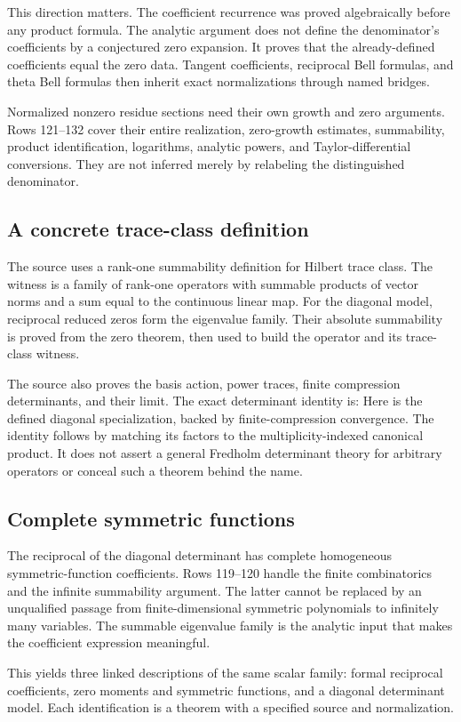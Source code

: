 This direction matters. The coefficient recurrence was proved algebraically before any product formula. The analytic argument does not define the denominator's coefficients by a conjectured zero expansion. It proves that the already-defined coefficients equal the zero data. Tangent coefficients, reciprocal Bell formulas, and theta Bell formulas then inherit exact normalizations through named bridges.

Normalized nonzero residue sections need their own growth and zero arguments. Rows 121--132 cover their entire realization, zero-growth estimates, summability, product identification, logarithms, analytic powers, and Taylor-differential conversions. They are not inferred merely by relabeling the distinguished denominator.

\subsection{A concrete trace-class definition}
The source uses a rank-one summability definition for Hilbert trace class.
The witness is a family of rank-one operators with summable products of vector norms and a sum equal to the continuous linear map. For the diagonal model, reciprocal reduced zeros form the eigenvalue family. Their absolute summability is proved from the zero theorem, then used to build the operator and its trace-class witness.

The source also proves the basis action, power traces, finite compression determinants, and their limit. The exact determinant identity is:
Here  is the defined diagonal specialization, backed by finite-compression convergence. The identity follows by matching its factors to the multiplicity-indexed canonical product. It does not assert a general Fredholm determinant theory for arbitrary operators or conceal such a theorem behind the name.

\subsection{Complete symmetric functions}
The reciprocal of the diagonal determinant has complete homogeneous symmetric-function coefficients. Rows 119--120 handle the finite combinatorics and the infinite summability argument. The latter cannot be replaced by an unqualified passage from finite-dimensional symmetric polynomials to infinitely many variables. The summable eigenvalue family is the analytic input that makes the coefficient expression meaningful.

This yields three linked descriptions of the same scalar family: formal reciprocal coefficients, zero moments and symmetric functions, and a diagonal determinant model. Each identification is a theorem with a specified source and normalization.
